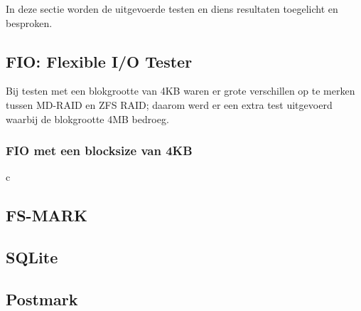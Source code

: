 In deze sectie worden de uitgevoerde testen en diens resultaten toegelicht en besproken.

\subsection{FIO: Flexible I/O Tester}

Bij testen met een blokgrootte van 4KB waren er grote verschillen op te merken tussen MD-RAID en ZFS RAID; daarom werd er een extra test uitgevoerd waarbij de blokgrootte 4MB bedroeg.

\subsubsection{FIO met een blocksize van 4KB}

\begin{table}
  \centering
  \begin{tabular}{c}
    \hline
    \multicolumn{}
    
  \end{tabular}
  \caption{Resultaten van de FIO-benchmark (blokgrootte: 4KB)}
  \label{tab:results_fio_4k }
\end{table}


\subsection{FS-MARK}

\subsection{SQLite}

\subsection{Postmark}


